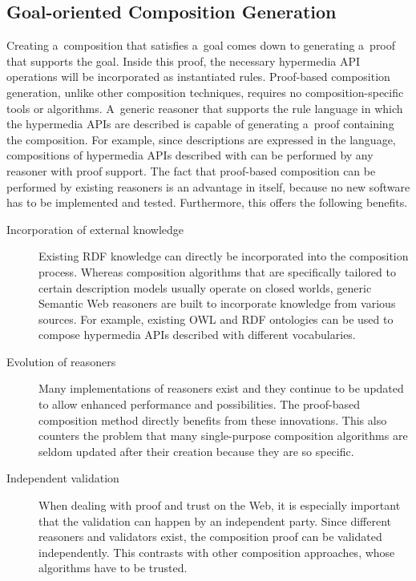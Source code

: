 \subsection{Goal-oriented Composition Generation}
Creating a~composition that satisfies a~goal comes down
to generating a~proof that supports the goal.
Inside this proof, the necessary hypermedia API operations will be incorporated as instantiated rules.
Proof-based composition generation,
unlike other composition techniques,
requires no composition-specific tools or algorithms.
A~generic reasoner that supports the rule language in which the hypermedia APIs are described
is capable of generating a~proof containing the composition.
For example, since \restdesc descriptions are expressed in the \nthree language,
compositions of hypermedia APIs described with \restdesc
can be performed by any \nthree reasoner with proof support.
The fact that proof-based composition can be performed by existing reasoners
is an advantage in itself,
because no new software has to be implemented and tested.
Furthermore, this offers the following benefits.
\begin{description}
\item[Incorporation of external knowledge]
  Existing RDF knowledge can directly be incorporated into the composition process.
  Whereas composition algorithms that are specifically tailored to certain description models
  usually operate on closed worlds,
  generic Semantic Web reasoners are built to incorporate knowledge from various sources.
  For example, existing OWL and RDF ontologies can be used
  to compose hypermedia APIs described with different vocabularies.
\item[Evolution of reasoners]
  Many implementations of reasoners exist
  and they continue to be updated to allow enhanced performance and possibilities.
  The proof-based composition method directly benefits from these innovations.
  This also counters the problem that many single-purpose composition algorithms
  are seldom updated after their creation because they are so specific.
\item[Independent validation]
  When dealing with proof and trust on the Web,
  it is especially important that the validation can happen by an independent party.
  Since different reasoners and validators exist,
  the composition proof can be validated independently.
  This contrasts with other composition approaches,
  whose algorithms have to be trusted.
\end{description}

